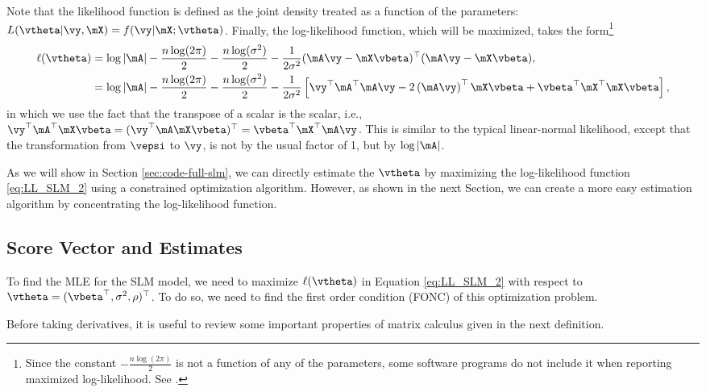 \documentclass[english,12pt]{book}\usepackage[]{graphicx}\usepackage[]{xcolor}
\begin{document}
Note that the likelihood function is defined as the joint density treated as a function of the parameters: $L(\vtheta|\vy, \mX) = f(\vy|\mX;\vtheta)$. Finally, the log-likelihood function, which will be maximized, takes the form\footnote{Since the constant $- \frac{n\log(2\pi)}{2}$ is not a function of any of the parameters, some software programs do not include it when reporting maximized log-likelihood. See \cite{spdep}.}
\begin{equation} \label{eq:LL_SLM_2}
  \begin{aligned}
\ell (\vtheta) &= \log\left| \mA\right| - \frac{n\log(2\pi)}{2} - \frac{n\log(\sigma^2)}{2} - \frac{1}{2\sigma^2}(\mA\vy-\mX\vbeta)^\top (\mA\vy-\mX\vbeta), \\
&= \log\left| \mA\right| - \frac{n\log(2\pi)}{2} - \frac{n\log(\sigma^2)}{2} - \frac{1}{2\sigma^2}\left[\vy^\top \mA^\top\mA\vy - 2\left(\mA\vy\right)^\top\mX\vbeta + \vbeta^\top\mX^\top\mX\vbeta\right],
\end{aligned}
\end{equation}	
%	
in which we use the fact that the transpose of a scalar is the scalar, i.e., 	$\vy^\top\mA^\top\mX\vbeta = (\vy^\top\mA\mX\vbeta)^\top = \vbeta^\top\mX^\top\mA\vy$. This is similar to the typical linear-normal likelihood, except that the transformation from $\vepsi$ to $\vy$, is not by the usual factor of 1, but by $\log\left| \mA\right|$.

As we will show in Section \ref{sec:code-full-slm}, we can directly estimate the $\vtheta$ by maximizing the log-likelihood function \eqref{eq:LL_SLM_2} using a constrained optimization algorithm. However, as shown in the next Section, we can create a more easy estimation algorithm by concentrating the log-likelihood function. 

\subsection{Score Vector and Estimates}\label{sec:score_sml}

To find the MLE for the SLM model, we need to maximize $\ell(\vtheta)$ in Equation \eqref{eq:LL_SLM_2} with respect to $\vtheta = (\vbeta^\top, \sigma^2 , \rho)^\top$. To do so, we need to find the first order condition (FONC) of this optimization problem. 

Before taking derivatives, it is useful to review some important properties of matrix calculus given in the next definition. 
\end{document}
